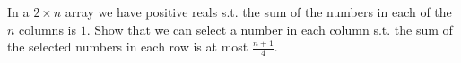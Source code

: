 In a $2\times n$ array we have positive reals s.t. the sum of the numbers in each of the $n$ columns is $1$. Show that we can select a number in each column s.t. the sum of the selected numbers in each row is at most $\frac{n+1}4$.